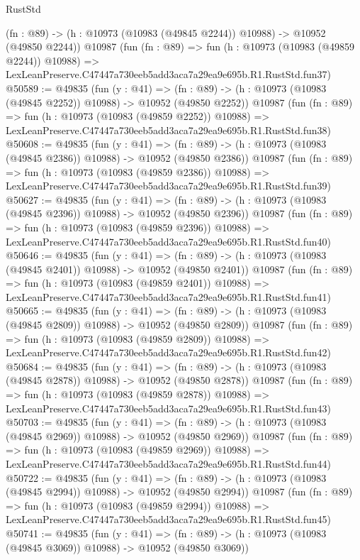\begin{lexlean}{RustStd}
\begin{coremodule}
    (fn : @89) -> (h : @10973 (@10983 (@49845 @2244)) @10988) -> @10952 (@49850 @2244))
    @10987
    (fun (fn : @89) =>
    fun (h : @10973 (@10983 (@49859 @2244)) @10988) =>
    LexLeanPreserve.C47447a730eeb5add3aca7a29ea9e695b.R1.RustStd.fun37)
@50589 := @49835
    (fun (y : @41) =>
    (fn : @89) -> (h : @10973 (@10983 (@49845 @2252)) @10988) -> @10952 (@49850 @2252))
    @10987
    (fun (fn : @89) =>
    fun (h : @10973 (@10983 (@49859 @2252)) @10988) =>
    LexLeanPreserve.C47447a730eeb5add3aca7a29ea9e695b.R1.RustStd.fun38)
@50608 := @49835
    (fun (y : @41) =>
    (fn : @89) -> (h : @10973 (@10983 (@49845 @2386)) @10988) -> @10952 (@49850 @2386))
    @10987
    (fun (fn : @89) =>
    fun (h : @10973 (@10983 (@49859 @2386)) @10988) =>
    LexLeanPreserve.C47447a730eeb5add3aca7a29ea9e695b.R1.RustStd.fun39)
@50627 := @49835
    (fun (y : @41) =>
    (fn : @89) -> (h : @10973 (@10983 (@49845 @2396)) @10988) -> @10952 (@49850 @2396))
    @10987
    (fun (fn : @89) =>
    fun (h : @10973 (@10983 (@49859 @2396)) @10988) =>
    LexLeanPreserve.C47447a730eeb5add3aca7a29ea9e695b.R1.RustStd.fun40)
@50646 := @49835
    (fun (y : @41) =>
    (fn : @89) -> (h : @10973 (@10983 (@49845 @2401)) @10988) -> @10952 (@49850 @2401))
    @10987
    (fun (fn : @89) =>
    fun (h : @10973 (@10983 (@49859 @2401)) @10988) =>
    LexLeanPreserve.C47447a730eeb5add3aca7a29ea9e695b.R1.RustStd.fun41)
@50665 := @49835
    (fun (y : @41) =>
    (fn : @89) -> (h : @10973 (@10983 (@49845 @2809)) @10988) -> @10952 (@49850 @2809))
    @10987
    (fun (fn : @89) =>
    fun (h : @10973 (@10983 (@49859 @2809)) @10988) =>
    LexLeanPreserve.C47447a730eeb5add3aca7a29ea9e695b.R1.RustStd.fun42)
@50684 := @49835
    (fun (y : @41) =>
    (fn : @89) -> (h : @10973 (@10983 (@49845 @2878)) @10988) -> @10952 (@49850 @2878))
    @10987
    (fun (fn : @89) =>
    fun (h : @10973 (@10983 (@49859 @2878)) @10988) =>
    LexLeanPreserve.C47447a730eeb5add3aca7a29ea9e695b.R1.RustStd.fun43)
@50703 := @49835
    (fun (y : @41) =>
    (fn : @89) -> (h : @10973 (@10983 (@49845 @2969)) @10988) -> @10952 (@49850 @2969))
    @10987
    (fun (fn : @89) =>
    fun (h : @10973 (@10983 (@49859 @2969)) @10988) =>
    LexLeanPreserve.C47447a730eeb5add3aca7a29ea9e695b.R1.RustStd.fun44)
@50722 := @49835
    (fun (y : @41) =>
    (fn : @89) -> (h : @10973 (@10983 (@49845 @2994)) @10988) -> @10952 (@49850 @2994))
    @10987
    (fun (fn : @89) =>
    fun (h : @10973 (@10983 (@49859 @2994)) @10988) =>
    LexLeanPreserve.C47447a730eeb5add3aca7a29ea9e695b.R1.RustStd.fun45)
@50741 := @49835
    (fun (y : @41) =>
    (fn : @89) -> (h : @10973 (@10983 (@49845 @3069)) @10988) -> @10952 (@49850 @3069))

\end{coremodule}
\end{lexlean}
